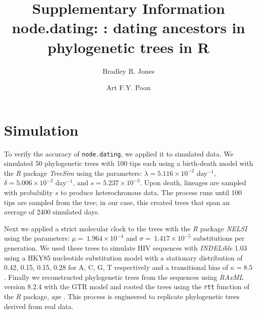 \documentclass{article}
\newcommand{\code}[1]{{\tt #1}}
\newcommand{\edit}[1]{#1}
\begin{document}
\title{Supplementary Information \\ node.dating: : dating ancestors in phylogenetic trees in R}

\author[1,2,*]{Bradley R. Jones}
\author[2,3]{Art F.Y. Poon}

\date{}

\maketitle

\section{Simulation} \label{sec:sim}
To verify the accuracy of \code{node.dating}, we applied it to simulated data.
We simulated 50 phylogenetic trees with 100 tips each using a birth-death model with the \emph{R} package \emph{TreeSim} \citep{TreeSim} using the parameters: $\lambda = 5.116 \times 10^{-2}$ day$^{-1}$, $\delta = 5.006 \times 10^{-2}$ day$^{-1}$, and $s = 5.237 \times 10^{-3}$.
\edit{Upon death, lineages are sampled with probability $s$ to produce heterochronous data.
The process runs until 100 tips are sampled from the tree; in our case, this created trees that span an average of 2400 simulated days.}

\edit{Next we} applied a strict molecular clock to the trees with the \emph{R} package \emph{NELSI} \citep{NELSI} using the parameters: $\mu = \ 1.964\times 10^{-4}$ and $\sigma = \ 1.417\times 10^{-5}$ substitutions per generation.
We used these trees to simulate HIV sequences with \emph{INDELible} 1.03 \citep{Indelible09} using a HKY85 nucleotide substitution model \cite{HKY85} with a stationary distribution of 0.42, 0.15, 0.15, 0.28 for A, C, G, T respectively and a transitional bias of $\kappa = 8.5$.
Finally we reconstructed phylogenetic trees from the sequences using \emph{RAxML} version 8.2.4 \citep{Raxml14} with the GTR model and rooted the trees using the \code{rtt} function of the \emph{R} package, \emph{ape} \citep{APE}.
This process is engineered to replicate phylogenetic trees derived from real data.
\end{document}
